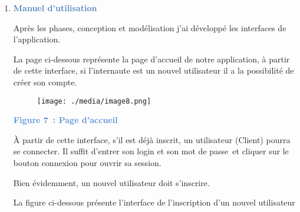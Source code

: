 \documentclass[12pt]{report}
\begin{document}
\begin{enumerate}[label*={\fontsize{18pt}{18pt}\selectfont \textbf{\arabic*.}}]
	\item {\fontsize{14pt}{16.8pt}\selectfont \textbf{\textcolor[HTML]{4F81BD}{Manuel d’utilisation}}\par}\par

\begin{justify}
Après les phases, conception et modélisation j’ai développé les interfaces de l’application.
\end{justify}\par

\begin{justify}
La page ci-dessous représente la page d'accueil de notre application, à partir de cette interface, si l'internaute est un nouvel utilisateur il a la possibilité de créer son compte.
\end{justify}\par




\begin{figure}[H]
\advance\leftskip 0.97in		\texttt{[image: ./media/image8.png]}
\end{figure}



\par



\begin{Center}
\textbf{\textcolor[HTML]{548DD4}{Figure 7 : Page d’accueil }}
\end{Center}\par


\vspace{\baselineskip}
À partir de cette interface, s'il est déjà inscrit, un utilisateur (Client) pourra se connecter. Il suffit d'entrer son login et son mot de passe\ et cliquer sur le bouton  connexion pour ouvrir sa session.\par

Bien évidemment, un nouvel utilisateur doit s'inscrire.\par

La figure ci-dessous présente l'interface de l'inscription d'un nouvel utilisateur\par




\end{enumerate}
\end{document}

